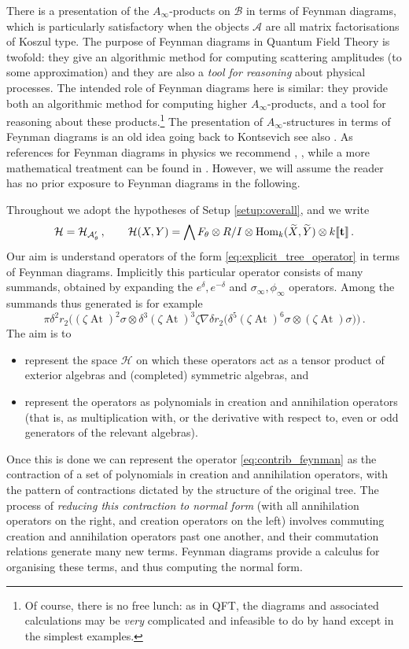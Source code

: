 \documentclass[english,letter paper,12pt,leqno]{article}
\theoremstyle{example}
\numberwithin{equation}{section}
\def\AA{\mathcal{A}}
\def\BB{\mathcal{B}}
\def\HH{\HH}
\def\HH{\mathcal{H}}
\def\Hom{\operatorname{Hom}}
\def\be{\begin{equation}}
\def\ee{\end{equation}}
\DeclareMathOperator{\vAt}{At}
\begin{document}
There is a presentation of the $A_\infty$-products on $\BB$ in terms of Feynman diagrams, which is particularly satisfactory when the objects $\AA$ are all matrix factorisations of Koszul type. The purpose of Feynman diagrams in Quantum Field Theory is twofold: they give an algorithmic method for computing scattering amplitudes (to some approximation) and they are also a \emph{tool for reasoning} about physical processes. The intended role of Feynman diagrams here is similar: they provide both an algorithmic method for computing higher $A_\infty$-products, and a tool for reasoning about these products.\footnote{Of course, there is no free lunch: as in QFT, the diagrams and associated calculations may be \emph{very} complicated and infeasible to do by hand except in the simplest examples.} The presentation of $A_\infty$-structures in terms of Feynman diagrams is an old idea going back to Kontsevich \cite{??} see also \cite{??}. As references for Feynman diagrams in physics we recommend \cite[Ch. 6]{weinberg}, \cite[\S 4.4]{ps}, while a more mathematical treatment can be found in \cite{qftstring}. However, we will assume the reader has no prior exposure to Feynman diagrams in the following.

Throughout we adopt the hypotheses of Setup \ref{setup:overall}, and we write
\be\label{eq:hhalt_koszul}
\HH = \HH_{\AA'_\theta}\,, \qquad \HH(X,Y) = \bigwedge F_\theta \otimes R/I \otimes \Hom_k(\widetilde{X},\widetilde{Y}) \otimes k\llbracket \bold{t} \rrbracket\,.
\ee
Our aim is understand operators of the form \eqref{eq:explicit_tree_operator} in terms of Feynman diagrams. Implicitly this particular operator consists of many summands, obtained by expanding the $e^{\delta}, e^{-\delta}$ and $\sigma_\infty, \phi_\infty$ operators. Among the summands thus generated is for example
\be\label{eq:contrib_feynman}
\pi \delta^2 r_2\Big( (\zeta \vAt)^2 \sigma \otimes \delta^3 (\zeta \vAt)^3 \zeta \nabla \delta r_2\Big( \delta^5 (\zeta \vAt)^6 \sigma \otimes (\zeta \vAt) \sigma \Big) \Big)\,.
\ee
The aim is to
\begin{itemize}
\item represent the space $\HH$ on which these operators act as a tensor product of exterior algebras and (completed) symmetric algebras, and
\item represent the operators as polynomials in creation and annihilation operators (that is, as multiplication with, or the derivative with respect to, even or odd generators of the relevant algebras).
\end{itemize}
Once this is done we can represent the operator \eqref{eq:contrib_feynman} as the contraction of a set of polynomials in creation and annihilation operators, with the pattern of contractions dictated by the structure of the original tree. The process of \emph{reducing this contraction to normal form} (with all annihilation operators on the right, and creation operators on the left) involves commuting creation and annihilation operators past one another, and their commutation relations generate many new terms. Feynman diagrams provide a calculus for organising these terms, and thus computing the normal form.
\end{document}

